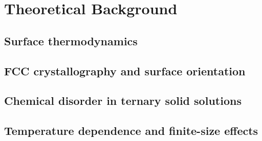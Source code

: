 \chapter{Theoretical Background}

\section{Surface thermodynamics}
\section{FCC crystallography and surface orientation}
\section{Chemical disorder in ternary solid solutions}
\section{Temperature dependence and finite-size effects}